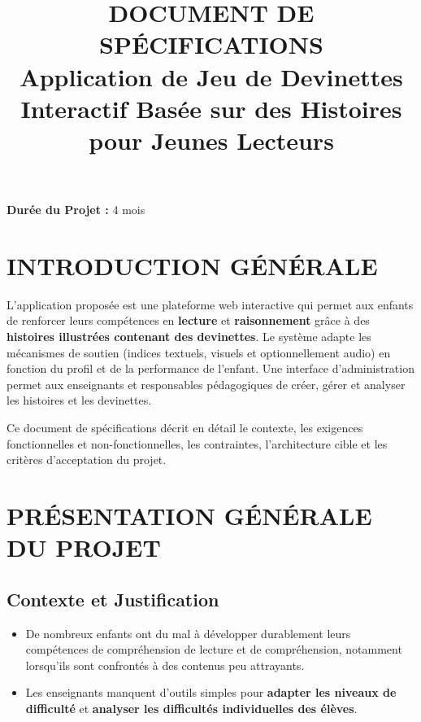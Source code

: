 \documentclass[12pt,a4paper]{article}
\title{\textbf{DOCUMENT DE SPÉCIFICATIONS} \\[0.5cm] \large Application de Jeu de Devinettes Interactif Basée sur des Histoires pour Jeunes Lecteurs}
\author{}
\begin{document}
\maketitle

\textbf{Durée du Projet :} 4 mois

\newpage

\tableofcontents

\newpage


\newpage

\section*{INTRODUCTION GÉNÉRALE}

L'application proposée est une plateforme web interactive qui permet aux enfants de renforcer leurs compétences en \textbf{lecture} et \textbf{raisonnement} grâce à des \textbf{histoires illustrées contenant des devinettes}. Le système adapte les mécanismes de soutien (indices textuels, visuels et optionnellement audio) en fonction du profil et de la performance de l'enfant. Une interface d'administration permet aux enseignants et responsables pédagogiques de créer, gérer et analyser les histoires et les devinettes.

Ce document de spécifications décrit en détail le contexte, les exigences fonctionnelles et non-fonctionnelles, les contraintes, l'architecture cible et les critères d'acceptation du projet.

\newpage

\section{PRÉSENTATION GÉNÉRALE DU PROJET}

\subsection{Contexte et Justification}

\begin{itemize}
    \item De nombreux enfants ont du mal à développer durablement leurs compétences de compréhension de lecture et de compréhension, notamment lorsqu'ils sont confrontés à des contenus peu attrayants.
    \item Les enseignants manquent d'outils simples pour \textbf{adapter les niveaux de difficulté} et \textbf{analyser les difficultés individuelles des élèves}.
\end{itemize}
\end{document}
